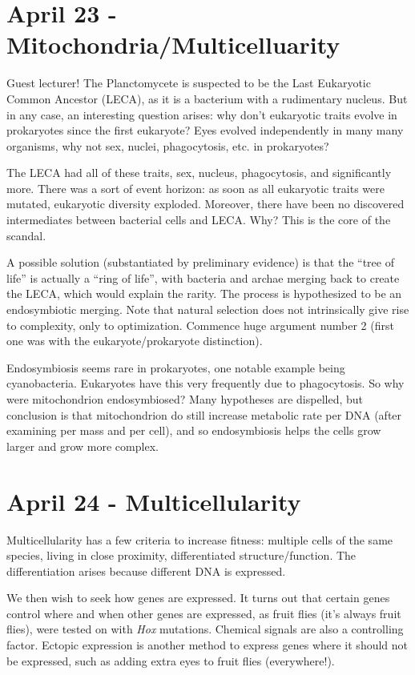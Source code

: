 \documentclass[12pt]{article}
\begin{document}
\section*{April 23 - Mitochondria/Multicelluarity}

Guest lecturer! The Planctomycete is suspected to be the Last Eukaryotic Common Ancestor (LECA), as it is a bacterium with a rudimentary nucleus. But in any case, an interesting question arises: why don't eukaryotic traits evolve in prokaryotes since the first eukaryote? Eyes evolved independently in many many organisms, why not sex, nuclei, phagocytosis, etc. in prokaryotes?

The LECA had all of these traits, sex, nucleus, phagocytosis, and significantly more. There was a sort of event horizon: as soon as all eukaryotic traits were mutated, eukaryotic diversity exploded. Moreover, there have been no discovered intermediates between bacterial cells and LECA. Why? This is the core of the scandal.

A possible solution (substantiated by preliminary evidence) is that the ``tree of life'' is actually a ``ring of life'', with bacteria and archae merging back to create the LECA, which would explain the rarity. The process is hypothesized to be an endosymbiotic merging. Note that natural selection does not intrinsically give rise to complexity, only to optimization. Commence huge argument number 2 (first one was with the eukaryote/prokaryote distinction). 

Endosymbiosis seems rare in prokaryotes, one notable example being cyanobacteria. Eukaryotes have this very frequently due to phagocytosis. So why were mitochondrion endosymbiosed? Many hypotheses are dispelled, but conclusion is that mitochondrion do still increase metabolic rate per DNA (after examining per mass and per cell), and so endosymbiosis helps the cells grow larger and grow more complex. 

\section*{April 24 - Multicellularity}

Multicellularity has a few criteria to increase fitness: multiple cells of the same species, living in close proximity, differentiated structure/function. The differentiation arises because different DNA is expressed. 

We then wish to seek how genes are expressed. It turns out that certain genes control where and when other genes are expressed, as fruit flies (it's always fruit flies), were tested on with \emph{Hox} mutations. Chemical signals are also a controlling factor. Ectopic expression is another method to express genes where it should not be expressed, such as adding extra eyes to fruit flies (everywhere!).
\end{document}
